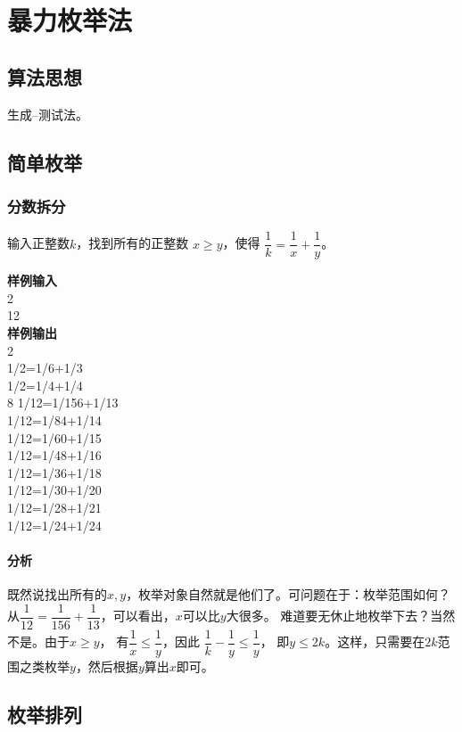 \chapter{暴力枚举法}

\section{算法思想} %
生成--测试法。

\section{简单枚举} %

\subsection{分数拆分}
输入正整数$k$，找到所有的正整数 $x \geq y$，使得 $\dfrac{1}{k}=\dfrac{1}{x}+\dfrac{1}{y}$。

\textbf{样例输入}\\
2 \\
12 \\

\textbf{样例输出} \\
2 \\
1/2=1/6+1/3 \\
1/2=1/4+1/4 \\
8
1/12=1/156+1/13 \\
1/12=1/84+1/14 \\
1/12=1/60+1/15 \\
1/12=1/48+1/16 \\
1/12=1/36+1/18 \\
1/12=1/30+1/20 \\
1/12=1/28+1/21 \\
1/12=1/24+1/24 \\

\subsubsection{分析}
既然说找出所有的$x,y$，枚举对象自然就是他们了。可问题在于：枚举范围如何？
从$\dfrac{1}{12}=\dfrac{1}{156}+\dfrac{1}{13}$，可以看出，$x$可以比$y$大很多。
难道要无休止地枚举下去？当然不是。由于$x \geq y$，
有$\dfrac{1}{x} \leq \dfrac{1}{y}$，因此 $\dfrac{1}{k}-\dfrac{1}{y} \leq \dfrac{1}{y}$，
即$y \leq 2k$。这样，只需要在$2k$范围之类枚举$y$，然后根据$y$算出$x$即可。

\section{枚举排列} %

